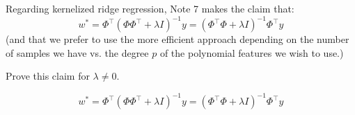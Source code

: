 \begin{Parts}
\begin{solution}
%


\end{solution}

\Part Regarding kernelized ridge regression, Note 7 makes the claim that:
$$w^* = \Phi^\top (\Phi \Phi^\top + \lambda I)^{-1}y = (\Phi^\top \Phi + \lambda I)^{-1} \Phi^\top y$$
(and that we prefer to use the more efficient approach depending on the number of samples we have vs. the degree $p$ of the polynomial features we wish to use.)

Prove this claim for $\lambda \neq 0$.

\begin{solution}
$$w^* = \Phi^\top (\Phi \Phi^\top + \lambda I)^{-1}y = (\Phi^\top \Phi + \lambda I)^{-1} \Phi^\top y$$


\end{solution}
\end{Parts}
